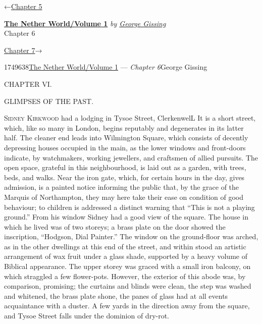 \hypertarget{headerContainer}{}
\hypertarget{navigationHeader}{}
\protect\hypertarget{headerprevious}{}{←\href{/wiki/The_Nether_World/Volume_1/Chapter_5}{Chapter
5}}

\textbf{\protect\hypertarget{header_title_text}{}{\href{/w/index.php?title=The_Nether_World/Volume_1\&action=edit\&redlink=1}{The
Nether World/Volume 1}}} \emph{by
\href{/wiki/Author:George_Gissing}{\protect\hypertarget{header_author_text}{}{{George
Gissing}}}}\\
\protect\hypertarget{header_section_text}{}{Chapter 6}

\protect\hypertarget{headernext}{}{\href{/wiki/The_Nether_World/Volume_1/Chapter_7}{Chapter
7}→}

\hypertarget{navigationNotes}{}

\hypertarget{ws-data}{}
\protect\hypertarget{ws-article-id}{}{1749638}\protect\hypertarget{ws-title}{}{\href{/w/index.php?title=The_Nether_World/Volume_1\&action=edit\&redlink=1}{The
Nether World/Volume 1} --- \emph{Chapter
6}}\protect\hypertarget{ws-author}{}{George Gissing}

{\protect\hypertarget{119}{}{}}

{CHAPTER VI.}

GLIMPSES OF THE PAST.

\textsc{Sidney Kirkwood} had a lodging in Tysoe Street, ClerkenwelL It
is a short street, which, like so many in London, begins reputably and
degenerates in its latter half. The cleaner end leads into Wilmington
Square, which consists of decently depressing houses occupied in the
main, as the lower windows and front-doors indicate, by watchmakers,
working jewellers, and craftsmen of allied pursuits. The open space,
grateful in this neighbourhood, is laid out as a garden, with trees,
beds, and walks. Near the iron gate, which, for certain hours in the
day, gives admission, is a painted notice informing the public that, by
the grace of the Marquis of Northampton, they may here take their ease
on condition of good behaviour; to children
{\protect\hypertarget{120}{}{}}is addressed a distinct warning that
``This is not a playing ground.'' From his window Sidney had a good view
of the square. The house in which he lived was of two storeys; a brass
plate on the door showed the inscription, ``Hodgson, Dial Painter.'' The
window on the ground-floor was arched, as in the other dwellings at this
end of the street, and within stood an artistic arrangement of wax fruit
under a glass shade, supported by a heavy volume of Biblical appearance.
The upper storey was graced with a small iron balcony, on which
straggled a few flower-pots. However, the exterior of this abode was, by
comparison, promising; the curtains and blinds were clean, the step was
washed and whitened, the brass plate shone, the panes of glass had at
all events acquaintance with a duster. A few yards in the direction away
from the square, and Tysoe Street falls under the dominion of dry-rot.

